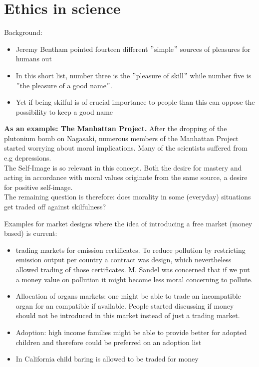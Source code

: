 

\chapter{Ethics in science}

Background:
\begin{itemize}
	\item Jeremy Bentham pointed fourteen different $"$simple$"$ sources of pleasures for humans out
	\item In this short list, number three is the $"$pleasure of skill$"$ while number five is $"$the pleasure of a good name$"$.
	\item Yet if being skilful is of crucial importance to people than this can oppose the possibility to keep a good name
\end{itemize}
  
  
  
\textbf{As an example: The Manhattan Project.} After the dropping of the plutonium bomb on Nagasaki, numerous members of the Manhattan Project started worrying about moral implications. Many of the scientists suffered from e.g depressions. \\ 

The Self-Image is so relevant in this concept. Both the desire for mastery and acting in accordance with moral values originate from the same source, a desire for positive self-image. \\ 

The remaining question is therefore: does morality in some (everyday) situations get traded off against skilfulness?



Examples for market designs where the idea of introducing a free market (money based) is current:
\begin{itemize}
	\item trading markets for emission certificates. To reduce pollution by restricting emission output per country a contract was design, which nevertheless allowed trading of those certificates. M. Sandel was concerned that if we put a money value on pollution it might become less moral concerning to pollute.
	\item Allocation of organs markets: one might be able to trade an incompatible organ for an compatible if available. People started discussing if money should not be introduced in this market instead of just a trading market.
	\item Adoption: high income families might be able to provide better for adopted children and therefore could be preferred on an adoption list
	\item In California child baring is allowed to be traded for money 
\end{itemize}

